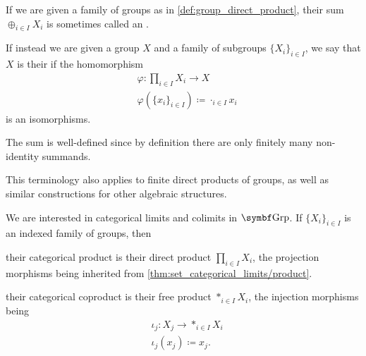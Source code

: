 \begin{remark}\label{def:group_direct_sum_external_internal}\cite[126]{Knapp2016BAlg}
  If we are given a family of groups as in \cref{def:group_direct_product}, their sum \( \oplus_{i \in I} X_i \) is sometimes called an .

  If instead we are given a group \( X \) and a family of subgroups \( \{ X_i \}_{i \in I} \), we say that \( X \) is their  if the homomorphism
  \begin{align*}
    &\varphi: \prod_{i \in I} X_i \to X \\
    &\varphi(\{ x_i \}_{i \in I}) \coloneqq \cdot_{i \in I} x_i
  \end{align*}
  is an isomorphisms.

  The sum is well-defined since by definition there are only finitely many non-identity summands.

  This terminology also applies to finite direct products of groups, as well as similar constructions for other algebraic structures.
\end{remark}

\begin{proposition}\label{thm:group_categorical_limits}
  We are interested in categorical limits and colimits in \( \Cat{Grp} \). If \( \{ X_i \}_{i \in I} \) is an indexed family of groups, then
  \begin{defenum}
     their categorical product is their direct product \( \prod_{i \in I} X_i \), the projection morphisms being inherited from \cref{thm:set_categorical_limits/product}.

     their categorical coproduct is their free product \( \ast_{i \in I} X_i \), the injection morphisms being
    \begin{align*}
      &\iota_j: X_j \to \ast_{i \in I} X_i \\
      &\iota_j(x_j) \coloneqq x_j.
    \end{align*}
  \end{defenum}
\end{proposition}

